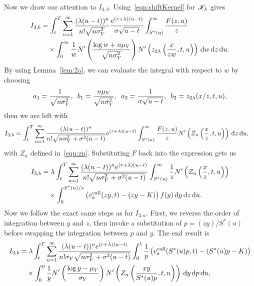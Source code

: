 		Now we draw our attention to $I_{3,b}$. Using~\eqref{eqn:shiftKernel} for $\mathscr K_\lambda$ gives
		\begin{align*}
			I_{3,b} &= \int_t^T \displaystyle\sum\limits_{n=1}^{\infty} \frac{(\lambda(u-t))^n}{n!\sqrt{n\sigma_Y^2}}\frac{e^{(r+\lambda)(u-t)}}{\sigma\sqrt{u-t}} \int_{S^*(u)}^\infty \frac{F(z,u)}{z}  \\
			&\quad {} \times \int_0^\infty  \frac{1}{w}N'\left( \frac{\log w + n\mu_Y}{\sqrt{n\sigma_Y^2}} \right)N'\left( z_{2\lambda}\left( \frac{x}{zw},t,u \right) \right) \, \mathrm d w \, \mathrm d z \, \mathrm d u.
		\end{align*}
		By using Lemma~\ref{lem:2a}, we can evaluate the integral with respect to $w$ by choosing
		$$
			a_1 = \frac{1}{\sqrt{n\sigma_Y^2}}, \enskip b_1 = \frac{n\mu_Y}{\sqrt{n\sigma_Y^2}}, \enskip a_2 = \frac{1}{\sigma\sqrt{u-t}}, \enskip b_2 = z_{2\lambda}(x/z,t,u),
		$$
		then we are left with
		\begin{align*}
			I_{3,b} &= \int_t^T \displaystyle\sum\limits_{n=1}^{\infty} \frac{(\lambda(u-t))^n}{n!\sqrt{n\sigma_Y^2 + \sigma^2(u-t)}}e^{(r+\lambda)(u-t)}\int_{S^*(u)}^\infty \frac{F(z,u)}{z}  N'\left( Z_n\left( \frac{x}{z},t, u \right) \right)  \, \mathrm d z \, \mathrm d u,
		\end{align*}
		with $Z_n$ defined in~\eqref{eqn:zn}. Substituting $F$ back into the expression gets us
		\begin{align*}
			I_{3,b} &= \lambda \int_t^T \displaystyle\sum\limits_{n=1}^{\infty} \frac{(\lambda(u-t))^ne^{(r+\lambda)(u-t)}}{n!\sqrt{n\sigma_Y^2 + \sigma^2(u-t)}}\int_{S^*(u)}^\infty \frac{1}{z}  N'\left( Z_n\left( \frac{x}{z},t, u \right) \right) \\
			&\quad {} \times \int_0^{S^*(u)/z} \left( v_{\text{a}}^{\text{call}}(zy,t) - (zy-K) \right) f(y) \, \mathrm d y  \, \mathrm d z \, \mathrm d u.
		\end{align*}
		Now we follow the exact same steps as for $I_{3,a}$. First, we reverse the order of integration between $y$ and $z$, then invoke a substitution of $p = (zy)/S^*(u)$ before swapping the integration between $p$ and $y$. The end result is
		\begin{align*}
			I_{3,b} &= \lambda \int_t^T \displaystyle\sum\limits_{n=1}^{\infty} \frac{(\lambda(u-t))^ne^{(r+\lambda)(u-t)}}{n!\sigma_Y\sqrt{n\sigma_Y^2 + \sigma^2(u-t)}}\int_0^1 \frac{1}{p}\left( v_{\text{a}}^{\text{call}}(S^*(u)p,t) - (S^*(u)p - K) \right) \\
			&\quad {} \times \int_0^p \frac{1}{y} N'\left( \frac{\log y - \mu_Y}{\sigma_Y} \right) N'\left( Z_n\left( \frac{xy}{S^*(u)p}, t, u \right) \right)\, \mathrm d y  \, \mathrm d p \, \mathrm d u,
		\end{align*}

